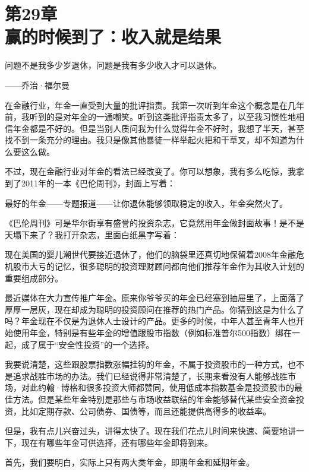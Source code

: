 
\section[第29章\q 赢的时候到了：收入就是结果]{第29章\\ 赢的时候到了：收入就是结果}

\begin{BookQuote}
问题不是我多少岁退休，问题是我有多少收入才可以退休。

\hfill ——乔治·福尔曼
\end{BookQuote}

在金融行业，年金一直受到大量的批评指责。我第一次听到年金这个概念是在几年前，我听到的是对年金的一通嘲笑。听到这类批评指责太多了，以至我习惯性地相信年金都是不好的。但是当别人质问我为什么觉得年金不好时，我想了半天，甚至找不到一条充分的理由。我只是像其他暴徒一样举起火把和干草叉，却不知道为什么要这么做。

不过，现在金融行业对年金的看法已经改变了。你可以想象，我有多么吃惊，我拿到了2011年的一本《巴伦周刊》，封面上写着：

最好的年金——专题报道——让你退休能够领取稳定的收入，年金突然火了。

《巴伦周刊》可是华尔街享有盛誉的投资杂志，它竟然用年金做封面故事！是不是天塌下来了？我打开杂志，里面白纸黑字写着：

现在美国的婴儿潮世代要接近退休了，他们的脑袋里还真切地保留着2008年金融危机股市大亏的记忆，很多聪明的投资理财顾问都向他们推荐年金作为其收入计划的重要组成部分。

最近媒体在大力宣传推广年金。原来你爷爷买的年金已经塞到抽屉里了，上面落了厚厚一层灰，现在却成为聪明的投资顾问在推荐的热门产品。你猜到这是为什么了吗？年金现在不仅是为退休人士设计的产品。更多的时候，中年人甚至青年人也开始使用年金，特别是有些年金的增值跟股市指数（例如标准普尔500指数）绑在一起，成了属于“安全性投资”的一个选择。

我要说清楚，这些跟股票指数涨幅挂钩的年金，不属于投资股市的一种方式，也不是追求战胜市场的办法。我们已经说得非常清楚了，长期来看没有人能够战胜市场，对此约翰·博格和很多投资大师都赞同，使用低成本指数基金是投资股市的最佳方法。但是某些年金特别是那些与市场收益联结的年金能够替代某些安全资金投资，比如定期存款、公司债券、国债等，而且还能提供高得多的收益率。

但是，我有点儿兴奋过头，讲得太快了。现在我们花点儿时间来快速、简要地讲一下，现在有哪些年金可供选择，还有哪些年金即将到来。

首先，我们要明白，实际上只有两大类年金，即期年金和延期年金。

